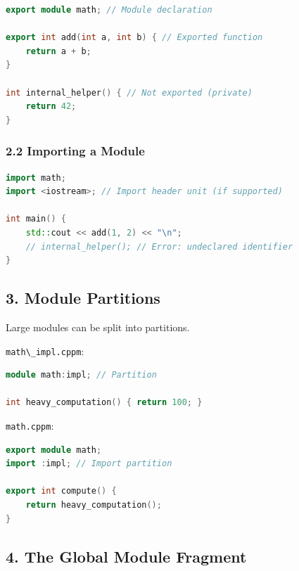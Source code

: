 \begin{lstlisting}[language={C++}]
export module math; // Module declaration

export int add(int a, int b) { // Exported function
    return a + b;
}

int internal_helper() { // Not exported (private)
    return 42;
}
\end{lstlisting}

\hypertarget{importing-a-module}{%
\subsubsection{2.2 Importing a Module}\label{importing-a-module}}

\begin{lstlisting}[language={C++}]
import math;
import <iostream>; // Import header unit (if supported)

int main() {
    std::cout << add(1, 2) << "\n";
    // internal_helper(); // Error: undeclared identifier
}
\end{lstlisting}

\hypertarget{module-partitions}{%
\subsection{3. Module Partitions}\label{module-partitions}}

Large modules can be split into partitions.

\passthrough{\lstinline!math\_impl.cppm!}:

\begin{lstlisting}[language={C++}]
module math:impl; // Partition

int heavy_computation() { return 100; }
\end{lstlisting}

\passthrough{\lstinline!math.cppm!}:

\begin{lstlisting}[language={C++}]
export module math;
import :impl; // Import partition

export int compute() {
    return heavy_computation();
}
\end{lstlisting}

\hypertarget{the-global-module-fragment}{%
\subsection{4. The Global Module
Fragment}\label{the-global-module-fragment}}

